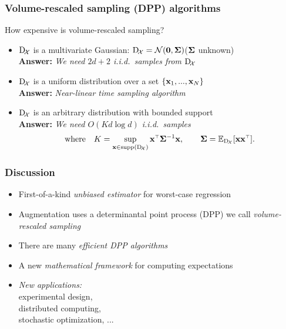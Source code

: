 \documentclass{beamer}
\begin{document}
\begin{frame}
  \frametitle{Volume-rescaled sampling (DPP) algorithms}
  How expensive is volume-rescaled sampling?\pause
  \begin{itemize}
  \item $\mathrm{D}_{\!\cal X}$ is a multivariate Gaussian: $\mathrm{D}_{\!\cal X}=\mathcal{N}(\mathbf 0,\mathbf{\Sigma})$\hfill ($\mathbf{\Sigma}$ unknown)\\\pause
    \textbf{Answer:} \textit{We need $2d+2$ i.i.d.~samples from $\mathrm{D}_{\!\cal X}$}\hfill \cite{correcting-bias}
    \pause\vspace{5mm}
  \item $\mathrm{D}_{\!\cal X}$ is a uniform distribution over a set $\{\mathbf x_1,...,\mathbf x_N\}$\\\pause
    \textbf{Answer:} \textit{Near-linear time sampling
      algorithm}\hfill \cite{leveraged-volume-sampling}\pause
    \vspace{5mm}
  \item $\mathrm{D}_{\!\cal X}$ is an arbitrary distribution with bounded support\\\pause
    \textbf{Answer:} \textit{We need $O(Kd\log d)$ i.i.d.~samples}\hfill \cite{correcting-bias-journal}
    \begin{align*}
      \text{where}\quad
      K = \sup_{\x\in\mathrm{supp}(\dx)}\x^\top\Sigmab^{-1}\x,\qquad \Sigmab=\E_{\dx}[\x\x^\top]. 
    \end{align*}
  \end{itemize}
\end{frame}


\begin{frame}
  \frametitle{Discussion}

  \begin{itemize}
  \item First-of-a-kind \emph{unbiased estimator} for worst-case regression\\[4mm]
    \pause
  \item Augmentation uses a determinantal point process (DPP) we call \emph{volume-rescaled sampling}\\[4mm]
    \pause
  \item There are many \emph{efficient DPP algorithms} \\[4mm]
    \pause
  \item A new \emph{mathematical framework} for computing expectations
\pause
  \item \emph{New applications:} \\[1mm]
    {\small  experimental design, \\
      distributed computing,\\
      stochastic optimization, ...}
  \end{itemize}
\end{frame}
\end{document}
